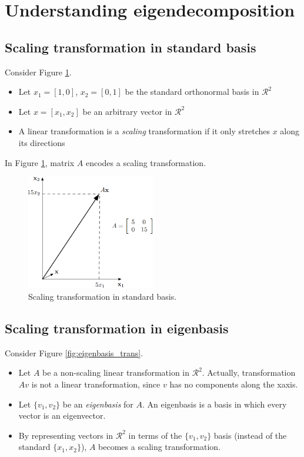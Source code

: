\section{Understanding eigendecomposition}

\subsection{Scaling transformation in standard basis}
Consider Figure \ref{fig:scalar_trans}.
\begin{itemize}
	\item Let $x_{1}= [1,0]$, $x_{2}= [0,1]$ be the standard orthonormal basis in
		$\mathcal{R}^{2}$

	\item Let $x = [x_{1}, x_{2}]$ be an arbitrary vector in $\mathcal{R}^{2}$

	\item A linear transformation is a \textit{scaling} transformation if it only
		stretches $x$ along its directions
\end{itemize}

In Figure \ref{fig:scalar_trans}, matrix $A$ encodes a scaling transformation.

\begin{figure}[H]
	\centering
	\includegraphics[width=0.5\textwidth]{
		images/04_LinearAlgebra_scalingVector.png
	}
	\caption{Scaling transformation in standard basis.}
	\label{fig:scalar_trans}
\end{figure}

\subsection{Scaling transformation in eigenbasis}
Consider Figure \ref{fig:eigenbasis_trans}.
\begin{itemize}
	\item Let $A$ be a non-scaling linear transformation in $\mathcal{R}^{2}$.
		Actually, transformation $Av$ is not a linear transformation, since $v$ has
		no components along the x\-axis.

	\item Let $\{v_{1}, v_{2}\}$ be an \textit{eigenbasis} for $A$. An eigenbasis is
		a basis in which every vector is an eigenvector.

	\item By representing vectors in $\mathcal{R}^{2}$ in terms of the $\{v_{1},v_{2}
		\}$ basis (instead of the standard $\{x_{1}, x_{2}\}$), $A$ becomes a
		scaling transformation.
\end{itemize}

